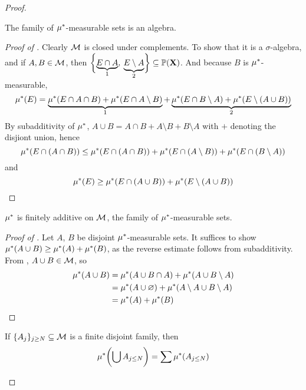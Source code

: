 \documentclass[../../main.tex]{subfiles}
\begin{document}
\begin{proof}
    \begin{lemma}\label{lem:mustar-measurable-is-algebra}
        The family of $\mu^*$-measurable sets is an algebra.
    \end{lemma}
    \begin{proof}[Proof of ]
        Clearly $\mathcal{M}$ is closed under complements. To show that it is a $\sigma$-algebra, and if $A,B\in\mathcal{M}$, then $\biggl\{{
        \underbrace{E\cap A}_{1},\:
        \underbrace{E\setminus A}_{2}}\biggr\}
        \subseteq \mathbb{P}({\mathbf{X}})$. 
        And because $B$ is $\mu^*$-measurable,
        \[
            \mu^*(E) = \underbrace{\mu^*(E\cap A\cap B) + \mu^*(E\cap A\setminus B)}_1  + \underbrace{\mu^*(E\cap B\setminus A) + \mu^*(E\setminus(A\cup B))}_{2}
        \]
        By subadditivity of $\mu^*$, $A\cup B = A\cap B + A\setminus B + B\setminus A$ with $+$ denoting the disjiont union, hence
        \[
            \mu^*(E\cap(A\cap B))\leq \mu^*(E\cap (A\cap B)) + \mu^*(E\cap (A\setminus B)) + \mu^*(E\cap(B\setminus A))
        \]
        and
        \[
            \mu^*(E)\geq \mu^*(E\cap (A\cup B)) + \mu^*(E\setminus(A\cup B))
        \]
    \end{proof}
    \begin{lemma}\label{lem:mustar-finite-additive-on-measurable-sets}
        $\mu^*$ is finitely additive on $\mathcal{M}$, the family of $\mu^*$-measurable sets.
    \end{lemma}
    \begin{proof}[Proof of ]
        Let $A$, $B$ be disjoint $\mu^*$-measurable sets. It suffices to show $\mu^*(A\cup B)\geq \mu^*(A) + \mu^*(B)$, as the reverse estimate follows from subadditivity. From , $A\cup B\in\mathcal{M}$, so 
        \begin{align*}
            \mu^*(A\cup B) &= \mu^*(A\cup B\cap A) + \mu^*(A\cup B\setminus A)\\
            &= \mu^*(A\cup \varnothing) +\mu^*(A\setminus A \cup B\setminus A)\\
            &= \mu^*(A) + \mu^*(B)
        \end{align*}
    \end{proof}
    \begin{corollary}
        If $\{A_j\}_{j\geq N}\subseteq\mathcal{M}$ is a finite disjoint family, then
        \[
            \mu^*\biggl( {\bigcup A_{j\leq N}}\biggr) = \sum \mu^*(A_{j\leq N})
        \]

\end{corollary}
\end{proof}
\end{document}
